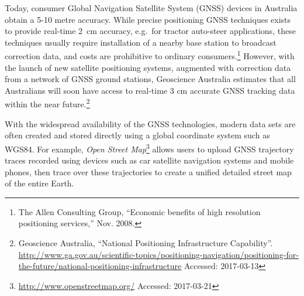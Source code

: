 Today, consumer Global Navigation Satellite System (GNSS) devices in
Australia obtain a 5-10 metre accuracy. While precise positioning GNSS
techniques exists to provide real-time 2~cm accuracy, e.g.~for tractor
auto-steer applications, these techniques usually require installation
of a nearby base station to broadcast correction data, and costs are
prohibitive to ordinary consumers.\footnote{The Allen Consulting Group,
  ``Economic benefits of high resolution positioning services,'' Nov.
  2008.} However, with the launch of new satellite positioning systems,
augmented with correction data from a network of GNSS ground stations,
Geoscience Australia estimates that all Australians will soon have
access to real-time 3 cm accurate GNSS tracking data within the near
future.\footnote{Geoscience Australia, ``National Positioning
  Infrastructure Capability''.
  \url{http://www.ga.gov.au/scientific-topics/positioning-navigation/positioning-for-the-future/national-positioning-infrastructure}
  Accessed: 2017-03-13}

With the widespread availability of the GNSS technologies, modern data
sets are often created and stored directly using a global coordinate
system such as WGS84. For example, \emph{Open Street Map}\footnote{\url{http://www.openstreetmap.org/}
  Accessed: 2017-03-21} allows users to upload GNSS trajectory traces
recorded using devices such as car satellite navigation systems and
mobile phones, then trace over these trajectories to create a unified
detailed street map of the entire Earth.


